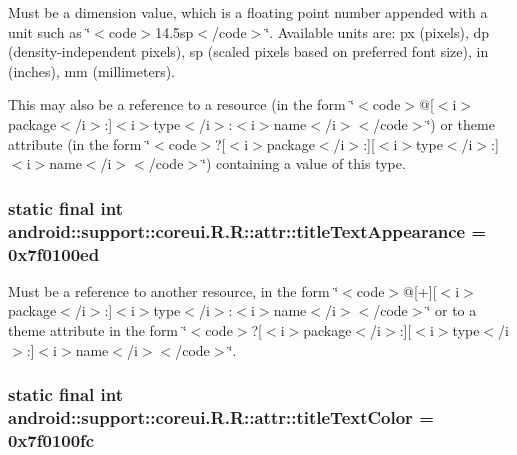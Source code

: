 Must be a dimension value, which is a floating point number appended with a unit such as \char`\"{}$<$code$>$14.5sp$<$/code$>$\char`\"{}. Available units are: px (pixels), dp (density-independent pixels), sp (scaled pixels based on preferred font size), in (inches), mm (millimeters). 

This may also be a reference to a resource (in the form \char`\"{}$<$code$>$@\mbox{[}$<$i$>$package$<$/i$>$:\mbox{]}$<$i$>$type$<$/i$>$:$<$i$>$name$<$/i$>$$<$/code$>$\char`\"{}) or theme attribute (in the form \char`\"{}$<$code$>$?\mbox{[}$<$i$>$package$<$/i$>$:\mbox{]}\mbox{[}$<$i$>$type$<$/i$>$:\mbox{]}$<$i$>$name$<$/i$>$$<$/code$>$\char`\"{}) containing a value of this type. \hypertarget{classandroid_1_1support_1_1coreui_1_1_r_1_1attr_5e834f9665a167329f3773a2a5d57aef}{
\subsubsection[{titleTextAppearance}]{\setlength{\rightskip}{0pt plus 5cm}static final int android::support::coreui.R.R::attr::titleTextAppearance = 0x7f0100ed}}
\label{classandroid_1_1support_1_1coreui_1_1_r_1_1attr_5e834f9665a167329f3773a2a5d57aef}


Must be a reference to another resource, in the form \char`\"{}$<$code$>$@\mbox{[}+\mbox{]}\mbox{[}$<$i$>$package$<$/i$>$:\mbox{]}$<$i$>$type$<$/i$>$:$<$i$>$name$<$/i$>$$<$/code$>$\char`\"{} or to a theme attribute in the form \char`\"{}$<$code$>$?\mbox{[}$<$i$>$package$<$/i$>$:\mbox{]}\mbox{[}$<$i$>$type$<$/i$>$:\mbox{]}$<$i$>$name$<$/i$>$$<$/code$>$\char`\"{}. \hypertarget{classandroid_1_1support_1_1coreui_1_1_r_1_1attr_39e4e1574bd3e0bed630a4702ce52b76}{
\subsubsection[{titleTextColor}]{\setlength{\rightskip}{0pt plus 5cm}static final int android::support::coreui.R.R::attr::titleTextColor = 0x7f0100fc}}
\label{classandroid_1_1support_1_1coreui_1_1_r_1_1attr_39e4e1574bd3e0bed630a4702ce52b76}


